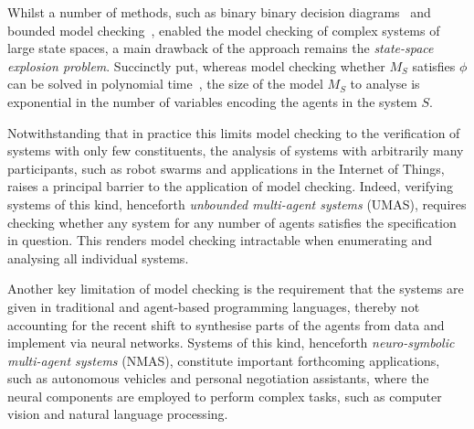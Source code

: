\documentclass{article}
\begin{document}
Whilst a number of methods, such as binary binary decision
diagrams~\cite{GammieMeyden04a} and bounded model
checking~\cite{PenczekLomuscio03b},   enabled the  model checking  of complex systems of
large state spaces, a main drawback of the approach remains the {\em state-space
explosion problem}. Succinctly put, whereas model checking whether $M_S$
satisfies $\phi$ can be solved in polynomial time~\cite{Clarke+99a}, the size of the model $M_S$ to
analyse is exponential in the number of variables encoding the agents in the
system $S$.  

Notwithstanding that in practice this limits model checking to the verification
of systems with only few constituents, the analysis of  systems with arbitrarily many
participants, such as robot swarms and  applications in the Internet of Things, 
raises a principal barrier to the application of model checking.  Indeed, 
verifying systems of this kind, henceforth {\em unbounded multi-agent systems}
(UMAS), requires checking whether any system for any number of agents satisfies
the specification in question. This  renders model checking intractable when 
enumerating and analysing all individual systems. 




Another key limitation of model checking is the requirement that the systems are
given in traditional and agent-based programming languages, thereby not accounting
for the recent shift to synthesise parts of the agents from data
and implement via neural networks. Systems of this kind, henceforth {\em
neuro-symbolic multi-agent systems} (NMAS), constitute important forthcoming
applications, such as autonomous vehicles and personal negotiation assistants,
where the neural components are employed to perform complex tasks, such as computer
vision and natural language processing.
\end{document}

